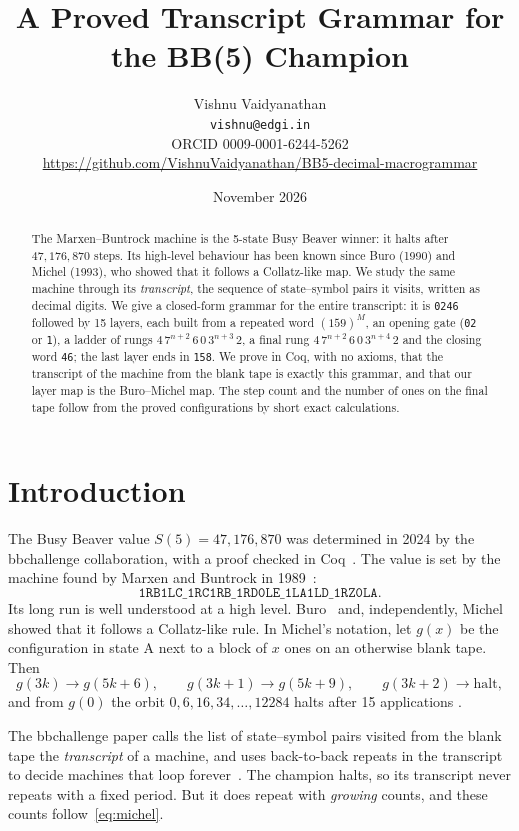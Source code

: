 \documentclass[11pt]{article}
\title{A Proved Transcript Grammar for the BB(5) Champion}
\author{Vishnu Vaidyanathan\\
\small \texttt{vishnu@edgi.in}\\
\small ORCID 0009-0001-6244-5262\\
\small \url{https://github.com/VishnuVaidyanathan/BB5-decimal-macrogrammar}}
\date{November 2026}
\theoremstyle{definition}
\theoremstyle{remark}
\begin{document}
\maketitle

\begin{abstract}
The Marxen--Buntrock machine is the 5-state Busy Beaver winner: it halts after
$47{,}176{,}870$ steps. Its high-level behaviour has been known since Buro (1990) and
Michel (1993), who showed that it follows a Collatz-like map. We study the same machine
through its \emph{transcript}, the sequence of state--symbol pairs it visits, written
as decimal digits. We give a closed-form grammar for the entire transcript: it is
\texttt{0246} followed by 15 layers, each built from a repeated word $(159)^M$, an
opening gate (\texttt{02} or \texttt{1}), a ladder of rungs
$4\,7^{n+2}\,6\,0\,3^{n+3}\,2$, a final rung $4\,7^{n+2}\,6\,0\,3^{n+4}\,2$ and the
closing word \texttt{46}; the last layer ends in \texttt{158}. We prove in Coq, with no
axioms, that the transcript of the machine from the blank tape is exactly this
grammar, and that our layer map is the Buro--Michel map. The step count and the number
of ones on the final tape follow from the proved configurations by short exact
calculations.
\end{abstract}

\section{Introduction}

The Busy Beaver value $S(5)=47{,}176{,}870$ was determined in 2024 by the bbchallenge
collaboration, with a proof checked in Coq~\cite{bbchallenge,coqbb5}. The value is set
by the machine found by Marxen and Buntrock in 1989~\cite{marxen}:
\[
\texttt{1RB1LC\_1RC1RB\_1RD0LE\_1LA1LD\_1RZ0LA}.
\]
Its long run is well understood at a high level. Buro~\cite{buro} and, independently,
Michel~\cite{michel93} showed that it follows a Collatz-like rule. In Michel's notation,
let $g(x)$ be the configuration in state A next to a block of $x$ ones on an otherwise
blank tape. Then
\begin{equation}\label{eq:michel}
g(3k)\to g(5k+6),\qquad g(3k+1)\to g(5k+9),\qquad g(3k+2)\to\text{halt},
\end{equation}
and from $g(0)$ the orbit $0,6,16,34,\dots,12284$ halts after 15 applications
\cite{michelbeh,wikiBB5}.

The bbchallenge paper calls the list of state--symbol pairs visited from the blank tape
the \emph{transcript} of a machine, and uses back-to-back repeats in the transcript to
decide machines that loop forever~\cite[Section~4.3.1]{bbchallenge}. The champion halts,
so its transcript never repeats with a fixed period. But it does repeat with
\emph{growing} counts, and these counts follow~\eqref{eq:michel}.
\end{document}
